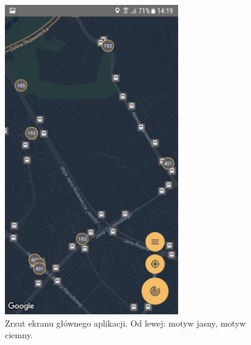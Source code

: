 \documentclass{SGGW-thesis}
\begin{document}
\begin{figure}
  \includegraphics[width=75mm]{screeny/glowny_ciemny}
  \caption[Ekran główny]{
    \label{screen.glowny}
    Zrzut ekranu głównego aplikacji. Od lewej: motyw jasny, motyw ciemny. \vspace{2ex}
  }
\end{figure}



\beforelastpage
\end{document}
